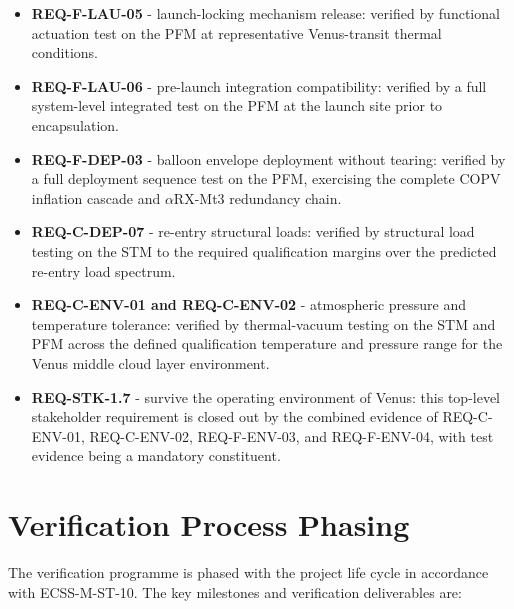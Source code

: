 \begin{itemize}[itemsep=1pt, parsep=1pt]
    \item \textbf{REQ-F-LAU-05} - launch-locking mechanism release: verified by functional actuation test on the PFM at representative Venus-transit thermal conditions.
    \item \textbf{REQ-F-LAU-06} - pre-launch integration compatibility: verified by a full system-level integrated test on the PFM at the launch site prior to encapsulation.
    \item \textbf{REQ-F-DEP-03} - balloon envelope deployment without tearing: verified by a full deployment sequence test on the PFM, exercising the complete COPV inflation cascade and $\alpha$RX-Mt3 redundancy chain.
    \item \textbf{REQ-C-DEP-07} - re-entry structural loads: verified by structural load testing on the STM to the required qualification margins over the predicted re-entry load spectrum.
    \item \textbf{REQ-C-ENV-01 and REQ-C-ENV-02} - atmospheric pressure and temperature tolerance: verified by thermal-vacuum testing on the STM and PFM across the defined qualification temperature and pressure range for the Venus middle cloud layer environment.
    \item \textbf{REQ-STK-1.7} - survive the operating environment of Venus: this top-level stakeholder requirement is closed out by the combined evidence of REQ-C-ENV-01, REQ-C-ENV-02, REQ-F-ENV-03, and REQ-F-ENV-04, with test evidence being a mandatory constituent.
\end{itemize}

\section{Verification Process Phasing}

The verification programme is phased with the project life cycle in accordance with ECSS-M-ST-10. The key milestones and verification deliverables are:

